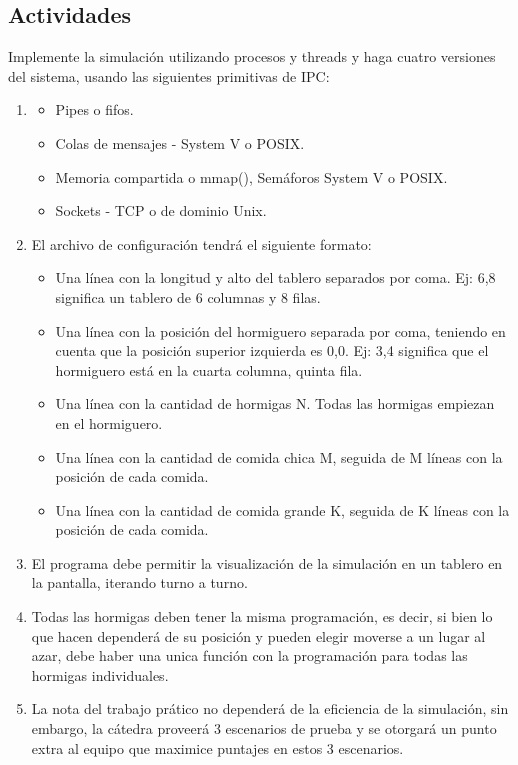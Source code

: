 \documentclass[a4paper,10pt]{article}
\begin{document}
\subsection{Actividades}
Implemente la simulación utilizando procesos y threads y haga cuatro versiones del sistema, 
usando las siguientes primitivas de IPC:
\begin{enumerate}
 \item 
    \begin{itemize}
      \item Pipes o fifos.
      \item Colas de mensajes - System V o POSIX.
      \item Memoria compartida o mmap(), Semáforos System V o POSIX.
      \item Sockets - TCP o de dominio Unix.
    \end{itemize}
  \item El archivo de configuración tendrá el siguiente formato:
    \begin{itemize}
     \item Una línea con la longitud y alto del tablero separados por coma. Ej: 6,8
      significa un tablero de 6 columnas y 8 filas.
     \item Una línea con la posición del hormiguero separada por coma, teniendo en
      cuenta que la posición superior izquierda es 0,0. Ej: 3,4 significa que el
      hormiguero está en la cuarta columna, quinta fila.
     \item Una línea con la cantidad de hormigas N. Todas las hormigas empiezan
      en el hormiguero.
     \item Una línea con la cantidad de comida chica M, seguida de M líneas con la
      posición de cada comida.
     \item Una línea con la cantidad de comida grande K, seguida de K líneas con la
      posición de cada comida.
    \end{itemize}
  \item El programa debe permitir la visualización de la simulación en un tablero en
   la pantalla, iterando turno a turno.
  \item Todas las hormigas deben tener la misma programación, es decir, si bien
  lo que hacen dependerá de su posición y pueden elegir moverse a un lugar al
  azar, debe haber una unica función con la programación para todas las hormigas
  individuales.
  \item La nota del trabajo prático no dependerá de la eficiencia de la simulación,
   sin embargo, la cátedra proveerá 3 escenarios de prueba y se otorgará un punto
    extra al equipo que maximice puntajes en estos 3 escenarios.

\end{enumerate}
\end{document}
